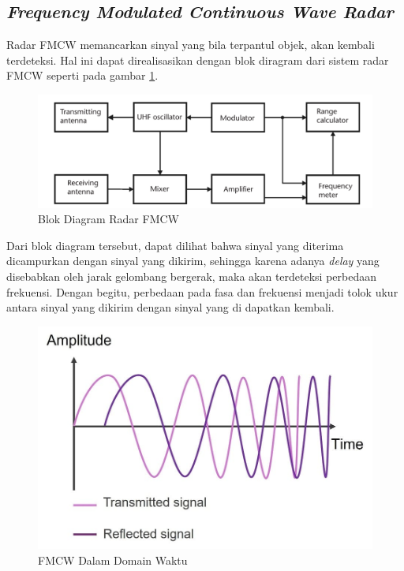 \subsection{\textit{Frequency Modulated Continuous Wave Radar}}

Radar FMCW memancarkan sinyal yang bila terpantul objek, akan kembali terdeteksi. Hal ini dapat direalisasikan dengan blok diragram dari sistem radar FMCW seperti pada gambar \ref{pic:FMCWBlock}.  

\begin{figure}
	\begin{center}
		\includegraphics[scale=0.3]{pics/bab2/blokDiagramFMCW.png}
		\caption[Blok Diagram Radar FMCW]{Blok Diagram Radar FMCW}
		\label{pic:FMCWBlock}
	\end{center}
\end{figure}

Dari blok diagram tersebut, dapat dilihat bahwa sinyal yang diterima dicampurkan dengan sinyal yang dikirim, sehingga karena adanya \textit{delay} yang disebabkan oleh jarak gelombang bergerak, maka akan terdeteksi perbedaan frekuensi. Dengan begitu, perbedaan pada fasa dan frekuensi menjadi tolok ukur antara sinyal yang dikirim dengan sinyal yang di dapatkan kembali.

\begin{figure}
	\begin{center}
		\includegraphics[scale=0.3]{pics/bab2/txRxWave.jpg}
		\caption[FMCW Dalam Domain Waktu]{FMCW Dalam Domain Waktu}
		\label{pic:FMCWTime}
	\end{center}
\end{figure}

